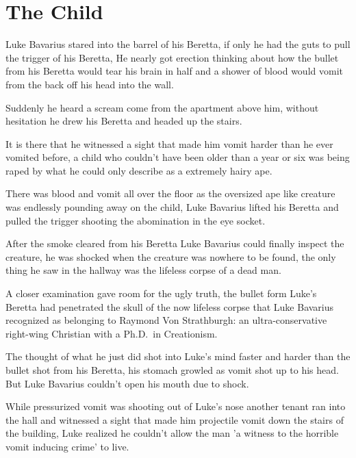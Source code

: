 \chapter{The Child}


Luke Bavarius stared into the barrel of his Beretta, if only he had
the guts to pull the trigger of his Beretta, He nearly got erection
thinking about how the bullet from his Beretta would tear his brain
in half and a shower of blood would vomit from the back off his
head into the wall.



Suddenly he heard a scream come from the apartment above him,
without hesitation he drew his Beretta and headed up the
stairs.



It is there that he witnessed a sight that made him vomit harder than he
ever vomited before, a child who couldn't have been older
than a year or six was being raped by what he could only describe
as a extremely hairy ape.



There was blood and vomit all over the floor as the oversized ape
like creature was endlessly pounding away on the child, Luke
Bavarius lifted his Beretta and pulled the trigger shooting the
abomination in the eye socket.



After the smoke cleared from his Beretta Luke Bavarius could
finally inspect the creature, he was shocked when the creature was
nowhere to be found, the only thing he saw in the hallway was the
lifeless corpse of a dead man.



A closer examination gave room for the ugly truth, the bullet form
Luke's Beretta had penetrated the skull of the now lifeless
corpse that Luke Bavarius recognized as belonging to Raymond Von Strathburgh: an
ultra-conservative right-wing Christian with a Ph.D.\ in
Creationism.



The thought of what he just did shot into Luke's mind faster
and harder than the bullet shot from his Beretta, his stomach
growled as vomit shot up to his head. But Luke Bavarius
couldn't open his mouth due to shock.



While pressurized vomit was shooting out of Luke's nose
another tenant ran into the hall and witnessed a sight that made
him projectile vomit down the stairs of the building, Luke realized
he couldn't allow the man 'a witness to the horrible vomit
inducing crime' to live.



